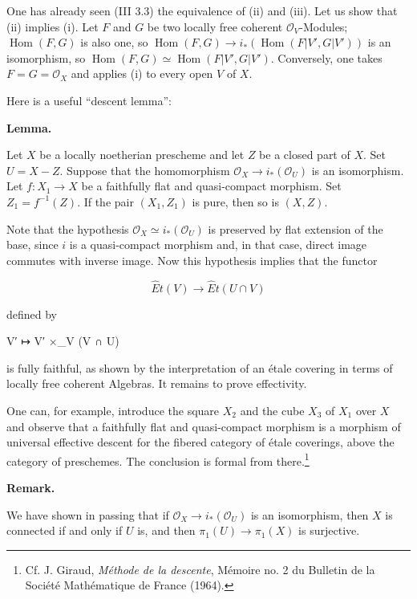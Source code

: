 \documentclass[
  11pt,
  a4paper,
]{book}
\newenvironment{Shaded}{}{}
\newcommand{\NormalTok}[1]{#1}
\begin{document}
One has already seen (III 3.3) the equivalence of (ii) and (iii). Let us
show that (ii) implies (i). Let \(F\) and \(G\) be two locally free
coherent \(\mathcal{O}_{V}\)-Modules; \(\operatorname{Hom}(F, G)\) is
also one, so \(\operatorname{Hom}(F,
G) \to i_{*}(\operatorname{Hom}(F|V', G|V'))\) is an isomorphism, so
\(\operatorname{Hom}(F, G) \simeq
\operatorname{Hom}(F|V', G|V')\). Conversely, one takes
\(F = G = \mathcal{O}_{X}\) and applies (i) to every open \(V\) of
\(X\).

Here is a useful ``descent lemma'':

\textbf{Lemma.}

Let \(X\) be a locally noetherian prescheme and let \(Z\) be a closed
part of \(X\). Set \(U = X - Z\). Suppose that the homomorphism
\(\mathcal{O}_{X} \to i_{*}(\mathcal{O}_{U})\) is an isomorphism. Let
\(f: X_{1} \to X\) be a faithfully flat and quasi-compact morphism. Set
\(Z_{1} = f^{-1}(Z)\). If the pair \((X_{1}, Z_{1})\) is pure, then so
is \((X, Z)\).

Note that the hypothesis
\(\mathcal{O}_{X} \simeq i_{*}(\mathcal{O}_{U})\) is preserved by flat
extension of the base, since \(i\) is a quasi-compact morphism and, in
that case, direct image commutes with inverse image. Now this hypothesis
implies that the functor

\[ \hat{E}t(V) \longrightarrow \hat{E}t(U \cap V) \]

defined by

\begin{Shaded}
\begin{Highlighting}[]
\NormalTok{V′ ↦ V′ ×\_V (V ∩ U)}
\end{Highlighting}
\end{Shaded}

is fully faithful, as shown by the interpretation of an étale covering
in terms of locally free coherent Algebras. It remains to prove
effectivity.

One can, for example, introduce the square \(X_{2}\) and the cube
\(X_{3}\) of \(X_{1}\) over \(X\) and observe that a faithfully flat and
quasi-compact morphism is a morphism of universal effective descent for
the fibered category of étale coverings, above the category of
preschemes. The conclusion is formal from there.\footnote{Cf. J. Giraud,
  \emph{Méthode de la descente}, Mémoire no. 2 du Bulletin de la Société
  Mathématique de France (1964).}

\textbf{Remark.}

We have shown in passing that if
\(\mathcal{O}_{X} \to i_{*}(\mathcal{O}_{U})\) is an isomorphism, then
\(X\) is connected if and only if \(U\) is, and then
\(\pi_{1}(U) \to \pi_{1}(X)\) is surjective.
\end{document}
